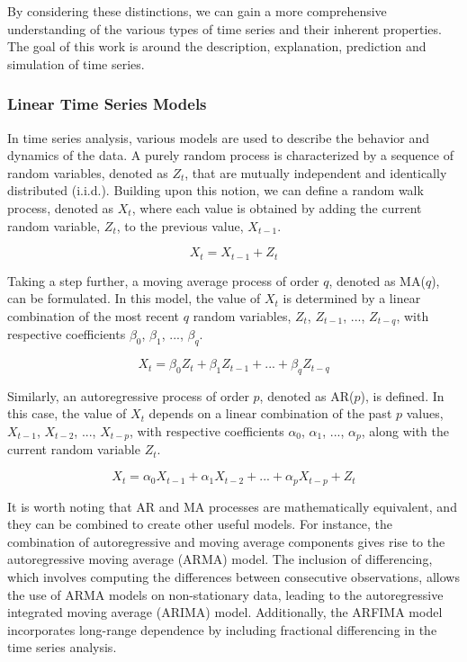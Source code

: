 \documentclass[../main.tex]{subfiles}
\begin{document}
        By considering these distinctions, we can gain a more comprehensive understanding of the various types of time series and their inherent properties. The goal of this work is around the description, explanation, prediction and simulation of time series.\par

    \subsubsection{Linear Time Series Models}
        In time series analysis, various models are used to describe the behavior and dynamics of the data. A purely random process is characterized by a sequence of random variables, denoted as {$Z_t$}, that are mutually independent and identically distributed (i.i.d.). Building upon this notion, we can define a random walk process, denoted as {$X_t$}, where each value is obtained by adding the current random variable, $Z_t$, to the previous value, $X_{t-1}$.

        $$X_t = X_{t-1} + Z_t$$

        Taking a step further, a moving average process of order $q$, denoted as MA($q$), can be formulated. In this model, the value of $X_t$ is determined by a linear combination of the most recent $q$ random variables, $Z_t$, $Z_{t-1}$, ..., $Z_{t-q}$, with respective coefficients $\beta_0$, $\beta_1$, ..., $\beta_q$.

        $$X_t = \beta_0Z_t + \beta_1Z_{t-1} + ...+ \beta_qZ_{t-q}$$

        Similarly, an autoregressive process of order $p$, denoted as AR($p$), is defined. In this case, the value of $X_t$ depends on a linear combination of the past $p$ values, $X_{t-1}$, $X_{t-2}$, ..., $X_{t-p}$, with respective coefficients $\alpha_0$, $\alpha_1$, ..., $\alpha_p$, along with the current random variable $Z_t$.

        $$X_t = \alpha_0X_{t-1} + \alpha_1X_{t-2} + ...+ \alpha_pX_{t-p} + Z_t$$
        
        It is worth noting that AR and MA processes are mathematically equivalent, and they can be combined to create other useful models. For instance, the combination of autoregressive and moving average components gives rise to the autoregressive moving average (ARMA) model. The inclusion of differencing, which involves computing the differences between consecutive observations, allows the use of ARMA models on non-stationary data, leading to the autoregressive integrated moving average (ARIMA) model. Additionally, the ARFIMA model incorporates long-range dependence by including fractional differencing in the time series analysis. \par
\end{document}
